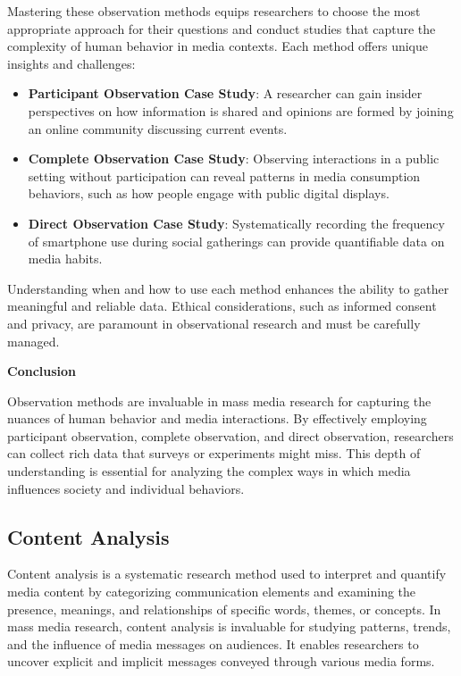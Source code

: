 \documentclass[
]{book}
\begin{document}
Mastering these observation methods equips researchers to choose the most appropriate approach for their questions and conduct studies that capture the complexity of human behavior in media contexts. Each method offers unique insights and challenges:

\begin{itemize}
\item
  \textbf{Participant Observation Case Study}: A researcher can gain insider perspectives on how information is shared and opinions are formed by joining an online community discussing current events.
\item
  \textbf{Complete Observation Case Study}: Observing interactions in a public setting without participation can reveal patterns in media consumption behaviors, such as how people engage with public digital displays.
\item
  \textbf{Direct Observation Case Study}: Systematically recording the frequency of smartphone use during social gatherings can provide quantifiable data on media habits.
\end{itemize}

Understanding when and how to use each method enhances the ability to gather meaningful and reliable data. Ethical considerations, such as informed consent and privacy, are paramount in observational research and must be carefully managed.

\textbf{Conclusion}

Observation methods are invaluable in mass media research for capturing the nuances of human behavior and media interactions. By effectively employing participant observation, complete observation, and direct observation, researchers can collect rich data that surveys or experiments might miss. This depth of understanding is essential for analyzing the complex ways in which media influences society and individual behaviors.

\subsection*{Content Analysis}\label{content-analysis}

Content analysis is a systematic research method used to interpret and quantify media content by categorizing communication elements and examining the presence, meanings, and relationships of specific words, themes, or concepts. In mass media research, content analysis is invaluable for studying patterns, trends, and the influence of media messages on audiences. It enables researchers to uncover explicit and implicit messages conveyed through various media forms.
\end{document}
